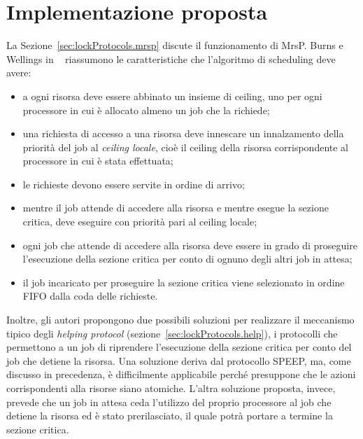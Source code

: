 



\chapter{Implementazione proposta}
\label{sec:implementazione}

La Sezione~\ref{sec:lockProtocols.mrsp} discute il funzionamento di MrsP. Burns e Wellings in ~\cite{Burns:2013:SCM:2547348.2547350} riassumono le caratteristiche che l'algoritmo di scheduling deve avere:

\begin{itemize}
\item a ogni risorsa deve essere abbinato un insieme di ceiling, uno per ogni processore in cui è allocato almeno un job che la richiede;
\item una richiesta di accesso a una risorsa deve innescare un innalzamento della priorità del job al \textit{ceiling locale}, cioè il ceiling della risorsa corrispondente al processore in cui è stata effettuata;
\item le richieste devono essere servite in ordine di arrivo;
\item mentre il job attende di accedere alla risorsa e mentre esegue la sezione critica, deve eseguire con priorità pari al ceiling locale;
\item ogni job che attende di accedere alla risorsa deve essere in grado di proseguire l'esecuzione della sezione critica per conto di ognuno degli altri job in attesa;
\item il job incaricato per proseguire la sezione critica viene selezionato in ordine FIFO dalla coda delle richieste. 
\end{itemize}

Inoltre, gli autori propongono due possibili soluzioni per realizzare il meccanismo tipico degli \textit{helping protocol} (sezione~\ref{sec:lockProtocols.help}), i protocolli che permettono a un job di riprendere l'esecuzione della sezione critica per conto del job che detiene la risorsa. Una soluzione deriva dal protocollo SPEEP, ma, come discusso in precedenza, è difficilmente applicabile perché presuppone che le azioni corrispondenti alla risorse siano atomiche. L'altra soluzione proposta, invece, prevede che un job in attesa ceda l'utilizzo del proprio processore al job che detiene la risorsa ed è stato prerilasciato, il quale potrà portare a termine la sezione critica.\\

